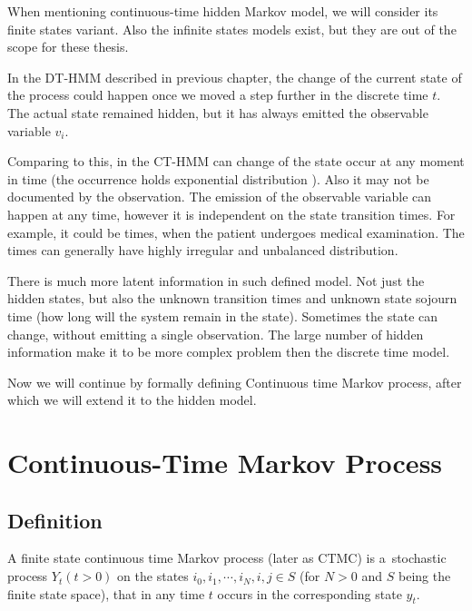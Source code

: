 \documentclass[thesis=M,english]{FITthesis}[2012/10/20]
\begin{document}
When mentioning continuous-time hidden Markov model, we will consider its finite states variant. Also the infinite states models exist, but they are out of the scope for these thesis.

In the DT-HMM described in previous chapter, the change of the current state of the process could happen once we moved a step further in the discrete time $t$. The actual state remained hidden, but it has always emitted the observable variable $v_i$.

Comparing to this, in the CT-HMM can change of the state occur at any moment in time (the occurrence holds exponential distribution ). Also it may not be documented by the observation. The emission of the observable variable can happen at any time, however it is independent on the state transition times. For example, it could be times, when the patient undergoes medical examination. The times can generally have highly irregular and unbalanced distribution.

There is much more latent information in such defined model. Not just the hidden states, but also the unknown transition times and unknown state sojourn time (how long will the system remain in the state).
Sometimes the state can change, without emitting a single observation. The large number of hidden information make it to be more complex problem then the discrete time model.

Now we will continue by formally defining Continuous time Markov process, after which we will extend it to the hidden model.

\section{Continuous-Time Markov Process} 

\subsection{Definition}
A finite state continuous time Markov process (later as CTMC) is a~stochastic process $Y_t (t > 0)$ on the states $i_0, i_1, \cdots, i_N, i, j \in S$ (for $N>0$ and $S$ being the finite state space), that in any time $t$  occurs in the corresponding state $y_t$. 
\end{document}
